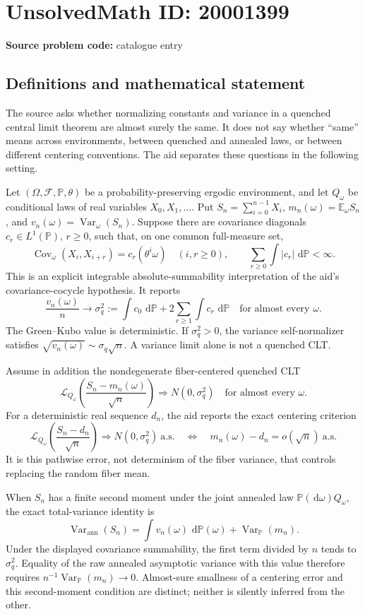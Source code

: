 \documentclass[11pt]{article}
\newcommand{\E}{\mathbb{E}}
\newcommand{\dd}{\,\mathrm{d}}
\begin{document}
\section*{UnsolvedMath ID: 20001399}
\textbf{Source problem code:} catalogue entry
\subsection{Definitions and mathematical statement}
The source asks whether normalizing constants and variance in a quenched central limit theorem are almost surely the same. It does not say whether ``same'' means across environments, between quenched and annealed laws, or between different centering conventions. The aid separates these questions in the following setting.

Let \((\Omega,\mathcal F,\mathbb P,\theta)\) be a probability-preserving ergodic environment, and let \(Q_\omega\) be conditional laws of real variables \(X_0,X_1,\ldots\). Put \(S_n=\sum_{i=0}^{n-1}X_i\), \(m_n(\omega)=\E_\omega S_n\), and \(v_n(\omega)=\operatorname{Var}_\omega(S_n)\). Suppose there are covariance diagonals \(c_r\in L^1(\mathbb P)\), \(r\geq0\), such that, on one common full-measure set,
\[
 \operatorname{Cov}_\omega(X_i,X_{i+r})=c_r(\theta^i\omega)
 \quad(i,r\geq0),\qquad
 \sum_{r\geq0}\int|c_r|\,\dd\mathbb P<\infty.
\]
This is an explicit integrable absolute-summability interpretation of the aid's covariance-cocycle hypothesis. It reports
\[
 \frac{v_n(\omega)}n\longrightarrow\sigma_q^2
 :=\int c_0\,\dd\mathbb P+2\sum_{r\geq1}\int c_r\,\dd\mathbb P
 \quad\text{for almost every }\omega.
\]
The Green--Kubo value is deterministic. If \(\sigma_q^2>0\), the variance self-normalizer satisfies \(\sqrt{v_n(\omega)}\sim\sigma_q\sqrt n\). A variance limit alone is not a quenched CLT.

Assume in addition the nondegenerate fiber-centered quenched CLT
\[
 \mathcal L_{Q_\omega}\!\left(\frac{S_n-m_n(\omega)}{\sqrt n}\right)
 \Longrightarrow N(0,\sigma_q^2)\quad\text{for almost every }\omega.
\]
For a deterministic real sequence \(d_n\), the aid reports the exact centering criterion
\[
 \mathcal L_{Q_\omega}\!\left(\frac{S_n-d_n}{\sqrt n}\right)
 \Longrightarrow N(0,\sigma_q^2)\ \text{a.s.}
 \quad\Longleftrightarrow\quad
 m_n(\omega)-d_n=o(\sqrt n)\ \text{a.s.}
\]
It is this pathwise error, not determinism of the fiber variance, that controls replacing the random fiber mean.

When \(S_n\) has a finite second moment under the joint annealed law \(\mathbb P(\dd\omega)Q_\omega\), the exact total-variance identity is
\[
 \operatorname{Var}_{\mathrm{ann}}(S_n)
 =\int v_n(\omega)\,\dd\mathbb P(\omega)
 +\operatorname{Var}_{\mathbb P}(m_n).
\]
Under the displayed covariance summability, the first term divided by \(n\) tends to \(\sigma_q^2\). Equality of the raw annealed asymptotic variance with this value therefore requires
\(n^{-1}\operatorname{Var}_{\mathbb P}(m_n)\to0\).
Almost-sure smallness of a centering error and this second-moment condition are distinct; neither is silently inferred from the other.
\end{document}
